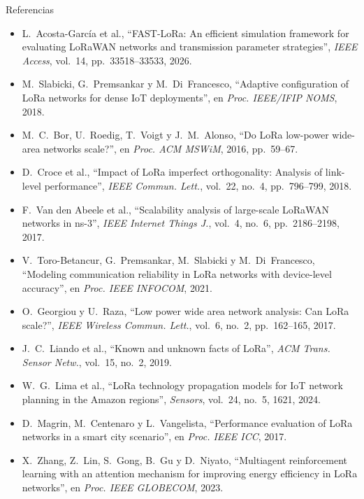 \documentclass[aspectratio=169,11pt]{beamer}
\def\etapa{0}
\begin{document}
\def\etapa{0}
\begin{frame}{Referencias}
  \vspace{0mm}
  \scriptsize
  \begin{itemize}\setlength\itemsep{0pt}\setlength\parskip{0pt}
    \item[{[1]}] L.~Acosta-García et al., “FAST-LoRa: An efficient simulation framework for evaluating LoRaWAN networks and transmission parameter strategies”, \emph{IEEE Access}, vol.~14, pp.~33518--33533, 2026.
    \item[{[2]}] M.~Slabicki, G.~Premsankar y M.~Di~Francesco, “Adaptive configuration of LoRa networks for dense IoT deployments”, en \emph{Proc. IEEE/IFIP NOMS}, 2018.
    \item[{[3]}] M.~C.~Bor, U.~Roedig, T.~Voigt y J.~M.~Alonso, “Do LoRa low-power wide-area networks scale?”, en \emph{Proc. ACM MSWiM}, 2016, pp.~59--67.
    \item[{[4]}] D.~Croce et al., “Impact of LoRa imperfect orthogonality: Analysis of link-level performance”, \emph{IEEE Commun. Lett.}, vol.~22, no.~4, pp.~796--799, 2018.
    \item[{[5]}] F.~Van den Abeele et al., “Scalability analysis of large-scale LoRaWAN networks in ns-3”, \emph{IEEE Internet Things J.}, vol.~4, no.~6, pp.~2186--2198, 2017.
    \item[{[6]}] V.~Toro-Betancur, G.~Premsankar, M.~Slabicki y M.~Di~Francesco, “Modeling communication reliability in LoRa networks with device-level accuracy”, en \emph{Proc. IEEE INFOCOM}, 2021.
    \item[{[7]}] O.~Georgiou y U.~Raza, “Low power wide area network analysis: Can LoRa scale?”, \emph{IEEE Wireless Commun. Lett.}, vol.~6, no.~2, pp.~162--165, 2017.
    \item[{[8]}] J.~C.~Liando et al., “Known and unknown facts of LoRa”, \emph{ACM Trans. Sensor Netw.}, vol.~15, no.~2, 2019.
    \item[{[9]}] W.~G.~Lima et al., “LoRa technology propagation models for IoT network planning in the Amazon regions”, \emph{Sensors}, vol.~24, no.~5, 1621, 2024.
    \item[{[10]}] D.~Magrin, M.~Centenaro y L.~Vangelista, “Performance evaluation of LoRa networks in a smart city scenario”, en \emph{Proc. IEEE ICC}, 2017.
    \item[{[11]}] X.~Zhang, Z.~Lin, S.~Gong, B.~Gu y D.~Niyato, “Multiagent reinforcement learning with an attention mechanism for improving energy efficiency in LoRa networks”, en \emph{Proc. IEEE GLOBECOM}, 2023.
  \end{itemize}
\end{frame}
\end{document}

